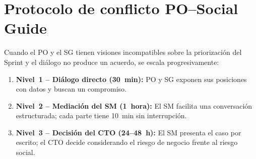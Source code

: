 \section{Protocolo de conflicto PO--Social Guide}

Cuando el PO y el SG tienen visiones incompatibles sobre la priorización del Sprint y el diálogo no produce un acuerdo, se escala progresivamente:

\begin{enumerate}[nosep]
    \item \textbf{Nivel~1 -- Diálogo directo (30~min):} PO y SG exponen sus posiciones con datos y buscan un compromiso.
    \item \textbf{Nivel~2 -- Mediación del SM (1~hora):} El SM facilita una conversación estructurada; cada parte tiene 10~min sin interrupción.
    \item \textbf{Nivel~3 -- Decisión del CTO (24--48~h):} El SM presenta el caso por escrito; el CTO decide considerando el riesgo de negocio frente al riesgo social.
\end{enumerate}

